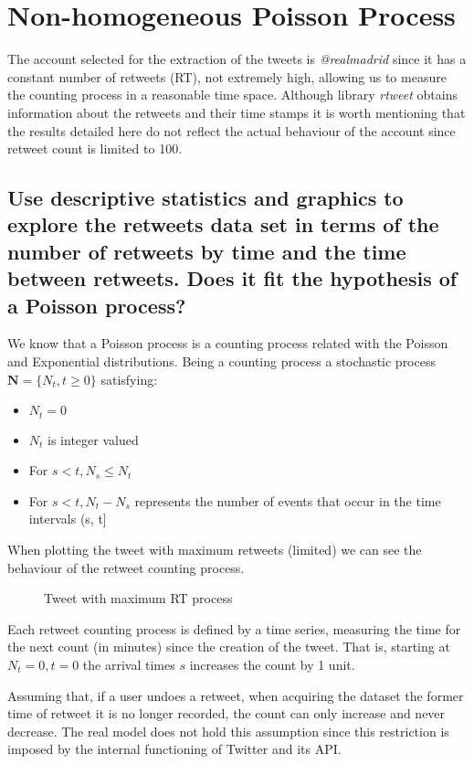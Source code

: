 
\section{Non-homogeneous Poisson Process}

The account selected for the extraction of the tweets is \textit{@realmadrid} since it has a constant number of retweets (RT), not extremely high, allowing us to measure the counting process in a reasonable time space. Although library \textit{rtweet} obtains information about the retweets and their time stamps it is worth mentioning that the results detailed here do not reflect the actual behaviour of the account since retweet count is limited to 100.

\subsection{Use descriptive statistics and graphics to explore the retweets data set in terms of the number of retweets by time and the time between retweets. Does it fit the hypothesis of a Poisson process?}

We know that a Poisson process is a counting process related with the Poisson and Exponential distributions. Being a counting process a stochastic process $\mathbf{N} = \{ N_t, t \geq 0 \}$ satisfying:
\begin{itemize}
	\item $N_t=0$
	\item $N_t$ is integer valued
	\item For $s<t, N_s \leq N_t$
	\item For $s<t, N_t - N_s$ represents the number of events that occur in the time intervals (s, t]
\end{itemize}

When plotting the tweet with maximum retweets (limited) we can see the behaviour of the retweet counting process.
\begin{figure}[H]
	\centering
	
	\vspace*{-0.9em}
	\caption{Tweet with maximum RT process}
\end{figure}

Each retweet counting process is defined by a time series, measuring the time for the next count (in minutes) since the creation of the tweet. That is, starting at $N_t=0, t=0$ the arrival times $s$ increases the count by 1 unit.

Assuming that, if a user undoes a retweet, when acquiring the dataset the former time of retweet it is no longer recorded, the count can only increase and never decrease. The real model does not hold this assumption since this restriction is imposed by the internal functioning of Twitter and its API.

